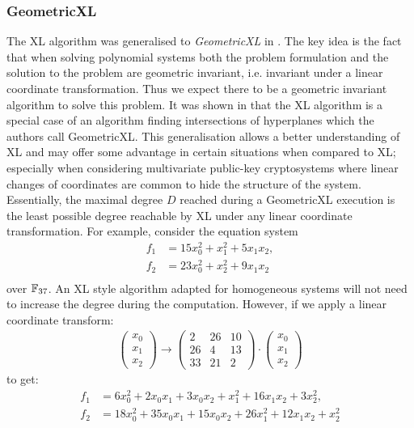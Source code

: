 \subsubsection{GeometricXL}
The XL algorithm was generalised to \emph{GeometricXL} in \cite{murphy-paterson:jmc2008}. The key idea is the fact that when solving polynomial systems both the problem formulation and the solution to the problem are geometric invariant, i.e. invariant under a linear coordinate transformation. Thus we expect there to be a geometric invariant algorithm to solve this problem. It was shown in \cite{murphy-paterson:jmc2008} that the XL algorithm is a special case of an algorithm finding intersections of hyperplanes which the authors call GeometricXL. This generalisation allows a better understanding of XL and may offer some advantage in certain situations when compared to XL; especially when considering multivariate public-key cryptosystems where linear changes of coordinates are common to hide the structure of the system. Essentially, the maximal degree $D$ reached during a GeometricXL execution is the least possible degree reachable by XL under any linear coordinate transformation. For example, consider the equation system 
\begin{align*}
 f_1 &= 15x_0^2 + x_1^2 + 5x_1x_2,\\
 f_2 &= 23x_0^2 + x_2^2 + 9x_1x_2\\
\end{align*}
over $\mathbb{F}_{37}$. An XL style algorithm adapted for homogeneous systems will not need to increase the degree during the computation. However, if we apply a linear coordinate transform:
\begin{align*}
\left(\begin{array}{r}
x_{0} \\
x_{1} \\
x_{2}
\end{array}\right)
\rightarrow
\left(\begin{array}{rrr}
2 & 26 & 10 \\
26 & 4 & 13 \\
33 & 21 & 2
\end{array}\right) \cdot 
\left(\begin{array}{r}
x_{0} \\
x_{1} \\
x_{2}
\end{array}\right)
\end{align*}
to get:
\begin{align*}
 f_1 &=  6x_0^2 + 2x_0x_1  + 3x_0x_2  +   x_1^2 + 16x_1x_2 + 3x_2^2,\\
 f_2 &= 18x_0^2 + 35x_0x_1 + 15x_0x_2 + 26x_1^2 + 12x_1x_2 + x_2^2\\
\end{align*}
